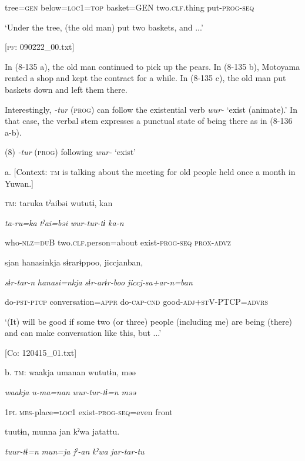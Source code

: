       tree=\textsc{gen}  below=\textsc{loc}1=\textsc{top}  basket=GEN  two.\textsc{clf}.thing  put-\textsc{prog}-\textsc{seq}

      ‘Under the tree, (the old man) put two baskets, and ...’

      [\textsc{pf}: 090222\_00.txt]

In (8-135 a), the old man continued to pick up the pears. In (8-135 b), Motoyama rented a shop and kept the contract for a while. In (8-135 c), the old man put baskets down and left them there.

  Interestingly, \textit{{}-tur} (\textsc{prog}) can follow the existential verb \textit{wur-} ‘exist (animate).’ In that case, the verbal stem expresses a punctual state of being there as in (8-136 a-b).

(8)  \textit{{}-tur} (\textsc{prog}) following \textit{wur-} ‘exist’

  a.  [Context: \textsc{tm} is talking about the meeting for old people held once a month in Yuwan.]

    \textsc{tm}:  taruka  tˀaibəi  wututɨ,  kan

      \textit{ta-ru=ka}  \textit{tˀai=bəi}  \textit{wur-tur{}-tɨ  ka-n}

      who-\textsc{nlz}=\textsc{du}B  two.\textsc{clf}.person=about  exist-\textsc{prog}-\textsc{seq}  \textsc{prox}-\textsc{advz}

      sjan  hanasinkja  sɨrarɨppoo,  jiccjanban,

      \textit{sɨr-tar-n}  \textit{hanasi=nkja}  \textit{sɨr-arɨr-boo}  \textit{jiccj-sa+ar-n=ban}

      do-\textsc{pst}-\textsc{ptcp}  conversation=\textsc{appr}  do-\textsc{cap}-\textsc{cnd}  good-\textsc{adj}+\textsc{st}V-PTCP=\textsc{advrs}

      ‘(It) will be good if some two (or three) people (including me) are being (there) and can make conversation like this, but ...’

      [Co: 120415\_01.txt]

  b.  \textsc{tm}:  waakja  umanan  wututɨn,  məə

      \textit{waakja}  \textit{u-ma=nan}  \textit{wur-tur{}-tɨ=n  məə}

      1\textsc{pl}  \textsc{mes}-place=\textsc{loc}1  exist-\textsc{prog}-\textsc{seq}=even  front

      tuutɨn,  munna  jan  kˀwa  jatattu.

      \textit{tuur-tɨ=n}  \textit{mun=ja}  \textit{jˀ-an}  \textit{kˀwa}  \textit{jar-tar-tu}

